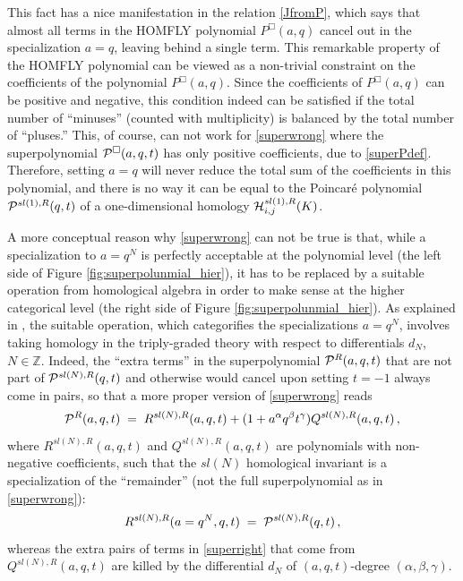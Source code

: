 \documentclass[hyper,letterpaper]{JHEP3}
\newcommand{\be}{\begin{equation}}
\newcommand{\ee}{\end{equation}}
\newcommand{\Z}{{\mathbb Z}}
\newcommand{\cH}{{\cal H }}
\renewcommand{\P}{{\cal P}}
\begin{document}
This fact has a nice manifestation in the relation \eqref{JfromP}, which says that almost all terms
in the HOMFLY polynomial $P^{\Box} (a,q)$ cancel out in the specialization $a=q$, leaving behind a single term.
This remarkable property of the HOMFLY polynomial %
can be viewed as a non-trivial constraint on the coefficients of the polynomial $P^{\Box} (a,q)$.
Since the coefficients of $P^{\Box} (a,q)$ can be positive and negative, this condition indeed
can be satisfied if the total number of ``minuses'' (counted with multiplicity) is balanced by the total number of ``pluses.''
%
This, of course, can not work for \eqref{superwrong} where the superpolynomial $\P^{\Box} (a,q,t)$
has only positive coefficients, due to \eqref{superPdef}. Therefore, setting $a=q$ will never reduce
the total sum of the coefficients in this polynomial, and there is no way it can be equal to
the Poincar\'e polynomial $\P^{sl(1),R} (q,t)$ of a one-dimensional homology $\cH^{sl(1),R}_{i,j} (K)$.

A more conceptual reason why \eqref{superwrong} can not be true is that, while a specialization to $a=q^N$ is
perfectly acceptable at the polynomial level (the left side of Figure \ref{fig:superpolunmial_hier}),
it has to be replaced by a suitable operation from homological algebra in order to
make sense at the higher categorical level (the right side of Figure \ref{fig:superpolunmial_hier}).
As explained in \cite{DGR}, the suitable operation, which categorifies the specializations $a=q^N$,
involves taking homology in the triply-graded theory with respect to differentials $d_N$, $N \in \Z$.
Indeed, the ``extra terms'' in the superpolynomial $\P^R (a,q,t)$ that are not part of
$\P^{sl(N),R} (q,t)$ and otherwise would cancel upon setting $t=-1$ always come in pairs,
so that a more proper version of \eqref{superwrong} reads
\be
\P^R (a,q,t) \; = \;
R^{sl(N),R} (a,q,t) + (1 + a^{\alpha} q^{\beta} t^{\gamma}) Q^{sl(N),R} (a,q,t) \,,
\label{superright}
\ee
where $R^{sl(N),R} (a,q,t)$ and $Q^{sl(N),R} (a,q,t)$ are polynomials with non-negative coefficients,
such that the $sl(N)$ homological invariant is a specialization of the ``remainder'' (not the full superpolynomial as in \eqref{superwrong}):
\be
R^{sl(N),R} (a=q^N,q,t) \; = \; \P^{sl(N),R} (q,t) \,,
\label{PRright}
\ee
whereas the extra pairs of terms in \eqref{superright} that come from $Q^{sl(N),R} (a,q,t)$
are killed by the differential $d_N$ of $(a,q,t)$-degree $(\alpha,\beta,\gamma)$.
\end{document}
